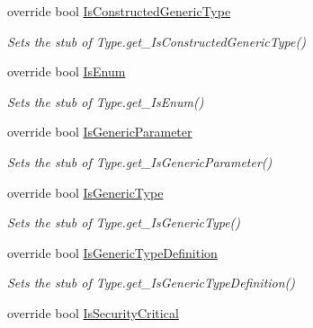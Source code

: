 \begin{DoxyCompactItemize}
override bool \hyperlink{class_system_1_1_fakes_1_1_stub_type_a511be1f73c60f51e963c626c127f2247}{Is\-Constructed\-Generic\-Type}
\begin{DoxyCompactList}\small\item\em Sets the stub of Type.\-get\-\_\-\-Is\-Constructed\-Generic\-Type()\end{DoxyCompactList}\item 
override bool \hyperlink{class_system_1_1_fakes_1_1_stub_type_aca783785beb29bdfb1d76fb7bd8bdbb7}{Is\-Enum}
\begin{DoxyCompactList}\small\item\em Sets the stub of Type.\-get\-\_\-\-Is\-Enum()\end{DoxyCompactList}\item 
override bool \hyperlink{class_system_1_1_fakes_1_1_stub_type_a166b9faae90eeb343a11204e4c7b54fc}{Is\-Generic\-Parameter}
\begin{DoxyCompactList}\small\item\em Sets the stub of Type.\-get\-\_\-\-Is\-Generic\-Parameter()\end{DoxyCompactList}\item 
override bool \hyperlink{class_system_1_1_fakes_1_1_stub_type_a48d5dc4bb69f0a9212d63d922b63d80a}{Is\-Generic\-Type}
\begin{DoxyCompactList}\small\item\em Sets the stub of Type.\-get\-\_\-\-Is\-Generic\-Type()\end{DoxyCompactList}\item 
override bool \hyperlink{class_system_1_1_fakes_1_1_stub_type_aec5724340f49b6dfaa181300beeca229}{Is\-Generic\-Type\-Definition}
\begin{DoxyCompactList}\small\item\em Sets the stub of Type.\-get\-\_\-\-Is\-Generic\-Type\-Definition()\end{DoxyCompactList}\item 
override bool \hyperlink{class_system_1_1_fakes_1_1_stub_type_a6da24a0c853b9d87aed02dad30d122ce}{Is\-Security\-Critical}

\end{DoxyCompactItemize}

